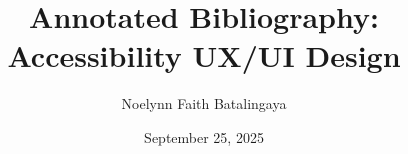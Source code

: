 \documentclass[12pt]{article}
\title{\textbf{Annotated Bibliography: Accessibility UX/UI Design}}
\author{Noelynn Faith Batalingaya}
\date{September 25, 2025}
\begin{document}
\maketitle

\nocite{*}



\end{document}

